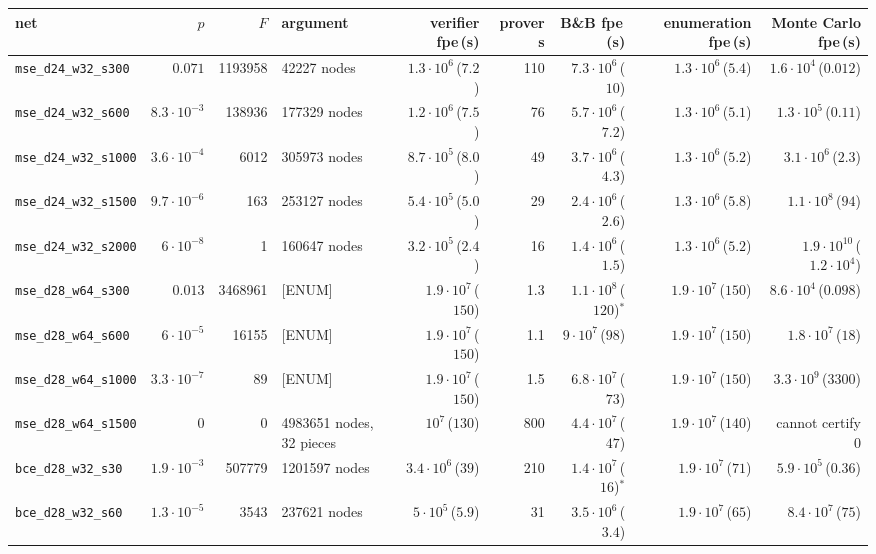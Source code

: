 \begin{tabular}{lrrlrrrrr}
\toprule
net & $p$ & $F$ & argument & verifier fpe\,(s) & prover s & B\&B fpe\,(s) & enumeration fpe\,(s) & Monte Carlo fpe\,(s)\\
\midrule
\texttt{mse\_d24\_w32\_s300} & $0.071$ & 1193958 & 42227 nodes & $1.3\cdot10^{6}$\,($7.2$) & 110 & $7.3\cdot10^{6}$\,($10$) & $1.3\cdot10^{6}$\,($5.4$) & $1.6\cdot10^{4}$\,($0.012$)\\
\texttt{mse\_d24\_w32\_s600} & $8.3\cdot10^{-3}$ & 138936 & 177329 nodes & $1.2\cdot10^{6}$\,($7.5$) & 76 & $5.7\cdot10^{6}$\,($7.2$) & $1.3\cdot10^{6}$\,($5.1$) & $1.3\cdot10^{5}$\,($0.11$)\\
\texttt{mse\_d24\_w32\_s1000} & $3.6\cdot10^{-4}$ & 6012 & 305973 nodes & $8.7\cdot10^{5}$\,($8.0$) & 49 & $3.7\cdot10^{6}$\,($4.3$) & $1.3\cdot10^{6}$\,($5.2$) & $3.1\cdot10^{6}$\,($2.3$)\\
\texttt{mse\_d24\_w32\_s1500} & $9.7\cdot10^{-6}$ & 163 & 253127 nodes & $5.4\cdot10^{5}$\,($5.0$) & 29 & $2.4\cdot10^{6}$\,($2.6$) & $1.3\cdot10^{6}$\,($5.8$) & $1.1\cdot10^{8}$\,($94$)\\
\texttt{mse\_d24\_w32\_s2000} & $6\cdot10^{-8}$ & 1 & 160647 nodes & $3.2\cdot10^{5}$\,($2.4$) & 16 & $1.4\cdot10^{6}$\,($1.5$) & $1.3\cdot10^{6}$\,($5.2$) & $1.9\cdot10^{10}$\,($1.2\cdot10^{4}$)\\
\texttt{mse\_d28\_w64\_s300} & $0.013$ & 3468961 & [ENUM] & $1.9\cdot10^{7}$\,($150$) & 1.3 & $1.1\cdot10^{8}$\,($120$)$^{\ast}$ & $1.9\cdot10^{7}$\,($150$) & $8.6\cdot10^{4}$\,($0.098$)\\
\texttt{mse\_d28\_w64\_s600} & $6\cdot10^{-5}$ & 16155 & [ENUM] & $1.9\cdot10^{7}$\,($150$) & 1.1 & $9\cdot10^{7}$\,($98$) & $1.9\cdot10^{7}$\,($150$) & $1.8\cdot10^{7}$\,($18$)\\
\texttt{mse\_d28\_w64\_s1000} & $3.3\cdot10^{-7}$ & 89 & [ENUM] & $1.9\cdot10^{7}$\,($150$) & 1.5 & $6.8\cdot10^{7}$\,($73$) & $1.9\cdot10^{7}$\,($150$) & $3.3\cdot10^{9}$\,($3300$)\\
\texttt{mse\_d28\_w64\_s1500} & $0$ & 0 & 4983651 nodes, 32 pieces & $10^{7}$\,($130$) & 800 & $4.4\cdot10^{7}$\,($47$) & $1.9\cdot10^{7}$\,($140$) & cannot certify 0\\
\texttt{bce\_d28\_w32\_s30} & $1.9\cdot10^{-3}$ & 507779 & 1201597 nodes & $3.4\cdot10^{6}$\,($39$) & 210 & $1.4\cdot10^{7}$\,($16$)$^{\ast}$ & $1.9\cdot10^{7}$\,($71$) & $5.9\cdot10^{5}$\,($0.36$)\\
\texttt{bce\_d28\_w32\_s60} & $1.3\cdot10^{-5}$ & 3543 & 237621 nodes & $5\cdot10^{5}$\,($5.9$) & 31 & $3.5\cdot10^{6}$\,($3.4$) & $1.9\cdot10^{7}$\,($65$) & $8.4\cdot10^{7}$\,($75$)\\

\end{tabular}
